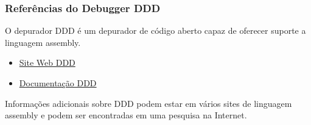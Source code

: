 \subsubsection{Referências do Debugger DDD}
O depurador DDD é um depurador de código aberto capaz de oferecer suporte a linguagem assembly.
\begin{itemize}
	\item \href{http://www.gnu.org/software/ddd/}{Site Web DDD}
	\item \href{http://www.gnu.org/software/ddd/manual/}{Documentação DDD}
\end{itemize}
Informações adicionais sobre DDD podem estar em vários sites de linguagem assembly e podem ser encontradas em uma pesquisa na Internet.
